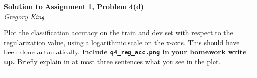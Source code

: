 \documentclass[letter,12pt]{article}
\newcommand{\myhwtitle}[3]
{\begin{center}
{\large {\bf Solution to Assignment {#1}, Problem {#2}}}\\
\medskip
{\it {#3}} %
\end{center}}
\newcommand{\solutionsAuthor}{Gregory King}
\begin{document}


\clearpage

\myhwtitle{1}{4(d)}{\solutionsAuthor}

\bigskip
\noindent Plot the classification accuracy on the train and dev set with respect to the regularization value, using a logarithmic scale on the x-axis. This should have been done automatically. \textbf{Include \texttt{q4\_reg\_acc.png} in your homework write up.} Briefly explain in at most three sentences what you see in the plot.\vspace{5mm}

\noindent\rule{\textwidth}{0.4pt}\vspace{5mm}

\begin{figure}[!h!p]
\begin{center}
\end{center}
\end{figure}


\end{document}
